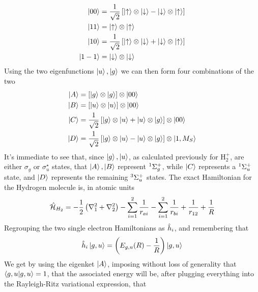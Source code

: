 \documentclass[../qm.tex]{subfiles}
\begin{document}
	\begin{equation}
		\begin{aligned}
			\ket{00}&=\frac{1}{\sqrt{2}}\left[ \ket{\up}\otimes\ket{\down}-\ket{\down}\otimes\ket{\up} \right]\\
			\ket{11}&=\ket{\up}\otimes\ket{\up}\\
			\ket{10}&=\frac{1}{\sqrt{2}}\left[ \ket{\up}\otimes\ket{\down}+\ket{\down}\otimes\ket{\up} \right]\\
			\ket{1-1}&=\ket{\down}\otimes\ket{\down}
		\end{aligned}
		\label{eq:eigenspinorsh2}
	\end{equation}
	Using the two eigenfunctions $\ket{u},\ket{g}$ we can then form four combinations of the two
	\begin{equation}
		\begin{aligned}
			\ket{A}&=\left[ \ket{g}\otimes\ket{g} \right]\otimes\ket{00}\\
			\ket{B}&=\left[ \ket{u}\otimes\ket{u} \right]\otimes\ket{00}\\
			\ket{C}&=\frac{1}{\sqrt{2}}\left[ \ket{g}\otimes\ket{u}+\ket{u}\otimes\ket{g} \right]\otimes\ket{00}\\
			\ket{D}&=\frac{1}{\sqrt{2}}\left[ \ket{g}\otimes\ket{u}-\ket{u}\otimes\ket{g} \right]\otimes\ket{1,M_S}
		\end{aligned}
		\label{eq:molecularspins}
	\end{equation}
	It's immediate to see that, since $\ket{g},\ket{u}$, as calculated previously for $\mathrm{H}_2^+$, are either $\sigma_g$ or $\sigma_u^{\star}$ states, that $\ket{A},\ket{B}$ represent $\term[g]{\Sigma^+}{1}$, while $\ket{C}$ represents a $\term[u]{\Sigma^+}{1}$ state, and $\ket{D}$ represents the remaining $\term[u]{\Sigma^+}{3}$ states.
	The exact Hamiltonian for the Hydrogen molecule is, in atomic units
	\begin{equation}
		\opr{\ham}_{H_2}=-\frac{1}{2}\left( \nabla^2_1+\nabla^2_2 \right)-\sum_{i=1}^2\frac{1}{r_{ai}}-\sum_{i=1}^2\frac{1}{r_{bi}}+\frac{1}{r_{12}}+\frac{1}{R}
		\label{eq:h2ham}
	\end{equation}
	Regrouping the two single electron Hamiltonians as $\opr{h}_i$, and remembering that
	\begin{equation*}
		\opr{h}_i\ket{g,u}=\left( E_{g,u}(R)-\frac{1}{R} \right)\ket{g,u}
	\end{equation*}
	We get by using the eigenket $\ket{A}$, imposing without loss of generality that $\bra{g,u}\ket{g,u}=1$, that the associated energy will be, after plugging everything into the Rayleigh-Ritz variational expression, that
\end{document}
